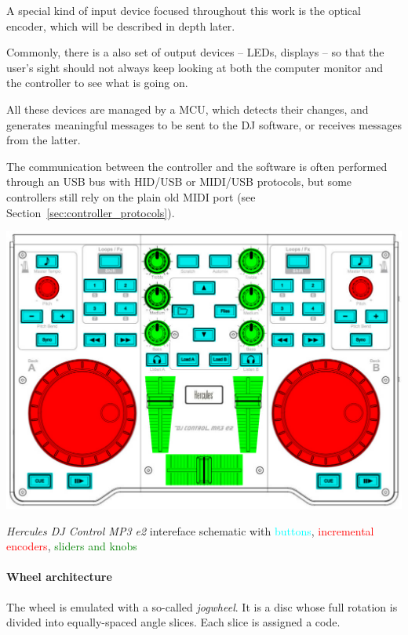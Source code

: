 \documentclass[a4paper,10pt]{article}
\makeatletter
\newenvironment{figurehere}{\def\@captype{figure}\vspace{2ex}}{\vspace{2ex}}
\makeatother
\begin{document}
\begin{multicols}{2}
A special kind of input device focused throughout this work is the optical
encoder, which will be described in depth later.

Commonly, there is a also set of output devices -- LEDs, displays -- so that
the user's sight should not always keep looking at both the computer monitor
and the controller to see what is going on.

All these devices are managed by a MCU, which detects their changes, and
generates meaningful messages to be sent to the DJ software, or receives
messages from the latter.

The communication between the controller and the software is often performed
through an USB bus with HID/USB or MIDI/USB protocols, but some controllers
still rely on the plain old MIDI port (see Section~\ref{sec:controller_protocols}).

\begin{figurehere}
	\centering
	\includegraphics[keepaspectratio=true,width=\columnwidth]{images/hercules_mp3e2_schematic.png}
	\caption{\emph{Hercules DJ Control MP3 e2} \cite{hercules_djcmp3e2}
	intereface schematic with \textcolor{cyan}{buttons}, \textcolor{red}{incremental encoders},
	\textcolor{green}{sliders and knobs}}
	\label{fig:hercules_mp3e2_schematic}
\end{figurehere}


\paragraph{Wheel architecture}
The wheel is emulated with a so-called \emph{jogwheel}. It is a disc whose
full rotation is divided into equally-spaced angle slices. Each slice is
assigned a code.


\end{multicols}
\end{document}
